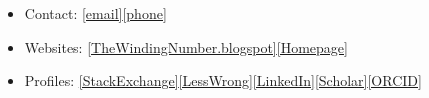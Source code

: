 \documentclass{article}
\begin{document}
\begin{itemize}
    \item Contact:  \href{mailto:abhimanyupallavisudhir@gmail.com}{[email]}\href{tel:+44-7771824896}{[phone]} %
    \item Websites: \href{https://thewindingnumber.blogspot.com/}{[TheWindingNumber.blogspot]}\href{https://abhimanyu.io/}{[Homepage]}
    \item Profiles: \href{https://math.stackexchange.com/users/78451/abhimanyu-pallavi-sudhir}{[StackExchange]}\href{https://www.lesswrong.com/users/abhimanyu-pallavi-sudhir}{[LessWrong]}\href{https://www.linkedin.com/in/abhimanyu-pallavi-sudhir/}{[LinkedIn]}\href{https://scholar.google.com/citations?user=lb38BjYAAAAJ&hl=en}{[Scholar]}\href{https://orcid.org/my-orcid?orcid=0000-0002-2506-0515}{[ORCID]}
\end{itemize}
\end{document}
